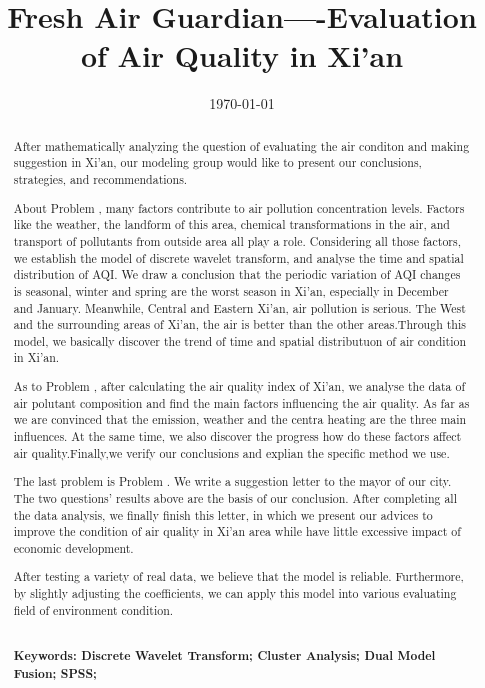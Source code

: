 \documentclass[a4paper,11pt]{article}
\title{Fresh Air Guardian----Evaluation of Air Quality in Xi'an}%
\date{\today}
\begin{document}
\begin{abstract}
\par After mathematically analyzing the question of evaluating the air conditon and making suggestion in Xi'an, our modeling group would like to present our conclusions, strategies, and recommendations.


\par About Problem \uppercase\expandafter{}, many factors contribute to air pollution concentration levels. Factors like the weather, the landform of this area, chemical transformations in the air, and transport of pollutants from outside area all play a role. Considering all those factors, we establish the model of discrete wavelet transform, and analyse the time and spatial distribution of AQI. We draw a conclusion that the periodic variation of AQI changes is seasonal, winter and spring are the worst season in Xi'an, especially in December and January. Meanwhile, Central and Eastern Xi'an, air pollution is serious. The West and the surrounding areas of Xi'an, the air is better than the other areas.Through this model, we basically discover the trend of time and spatial distributuon of air condition in Xi'an.

\par As to Problem \uppercase\expandafter{}, after calculating the air quality index of Xi'an, we analyse the data of air polutant composition and find the main factors influencing the air quality. As far as we are convinced that the emission, weather and the centra heating are the three main influences. At the same time, we also discover the progress how do these factors affect air quality.Finally,we verify our conclusions and explian the specific method we use.

\par The last problem is Problem \uppercase\expandafter{}. We write a suggestion letter to the mayor of our city. The two questions' results above are the basis of our conclusion. After completing all the data analysis, we finally finish this letter, in which we present our advices to improve the condition of air quality in Xi'an area while have little excessive impact of economic development.


\par After testing a variety of real data, we believe that the model is reliable. Furthermore, by slightly adjusting the coefficients, we can apply this model into various evaluating field of environment condition.
\textrm{\\}
\textrm{\\}

\textbf{Keywords: Discrete Wavelet Transform; Cluster Analysis; Dual Model Fusion; SPSS;} 


\end{abstract}
\maketitle%
\thispagestyle{empty}%
\end{document}
